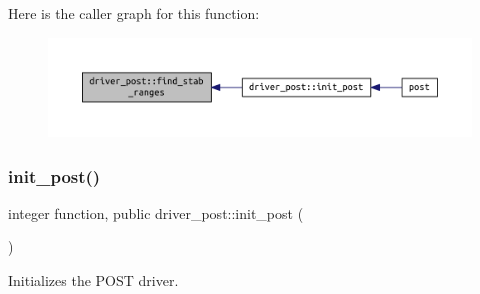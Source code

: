 Here is the caller graph for this function\+:\nopagebreak
\begin{figure}[H]
\begin{center}
\leavevmode
\includegraphics[width=350pt]{namespacedriver__post_a51ecad1032e415d2a8e6e5b97d2c7e09_icgraph}
\end{center}
\end{figure}
\mbox{\label{namespacedriver__post_af527706d4e696d4e507443d2f74194ef}} 
\subsubsection{\texorpdfstring{init\+\_\+post()}{init\_post()}}
{\footnotesize\ttfamily integer function, public driver\+\_\+post\+::init\+\_\+post (\begin{DoxyParamCaption}{ }\end{DoxyParamCaption})}



Initializes the P\+O\+ST driver. 


